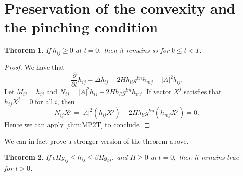 \documentclass[a4paper]{report}
\newtheorem{theorem}{Theorem}
\theoremstyle{remark}
\begin{document}
\section{Preservation of the convexity and the pinching condition}
\begin{theorem}
	If $h_{ij}^{} \geq 0 $ at $t=0,$ then it remains so for $0 \leq t < T.$ 
\end{theorem}
\begin{proof}
	We have that \[\frac{\partial }{\partial t} h_{ij}^{} = \Delta h_{ij}^{} - 2 H h_{li }^{} g_{}^{lm } h_{mj}^{} + \left| A \right| ^2 h_{ij}^{}.\]
	Let $M_{ij }^{} = h_{ij }^{} $ and $N_{ij }^{} = \left| A \right| ^2 h_{ij }^{} - 2 H h_{li }^{} g_{}^{lm } h_{mj}^{}.$
	If vector $X^j$ satisfies that $h_{ij }^{} X^j=0$ for all $i$, then
	\[N_{ij }^{} X^j = \left| A \right| ^2 (h_{ij }^{} X^j) - 2 H h_{li }^{} g_{}^{lm } (h_{mj}^{}X^j)=0.\]
	Hence we can apply \autoref{thm:MP2T} to conclude.
\end{proof}
We can in fact prove a stronger version of the theorem above.
\begin{theorem}
	If $\epsilon H g_{ij }^{} \leq h_{ij }^{} \leq \beta H g_{ij }^{} ,$ and $H \geq 0$ at $t=0,$ then it remains true for $t>0$.
\end{theorem}
\end{document}
